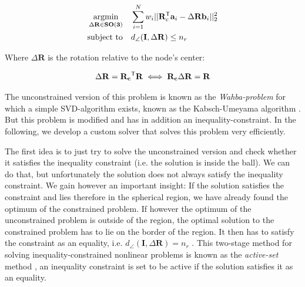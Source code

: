 \begin{equation}
	\label{eq:tls-rwls}
	\begin{aligned}
		\operatorname*{argmin}_{\Delta \mathbf{R} \in \mathbf{SO(3)}}  \quad &\sum_{i=1}^{N} w_i ||\mathbf{R}_c^{\mathsf{T}} \mathbf{a}_i - \Delta\mathbf{R} \mathbf{b}_i ||_2^2 \\
		\text{subject to} \quad &d_{\angle}(\mathbf{I}, \Delta\mathbf{R}) \leq n_r
	\end{aligned}
\end{equation}

Where $\Delta\mathbf{R}$ is the rotation relative to the node's center: 

\begin{equation}
	\begin{aligned}
		\Delta\mathbf{R} = \mathbf{R_c}^{\mathsf{T}}\mathbf{R} \iff \mathbf{R_c}\Delta\mathbf{R} = \mathbf{R}
	\end{aligned}
\end{equation}

The unconstrained version of this problem is known as the \textit{Wahba-problem} for which a simple SVD-algorithm exists, known as the Kabsch-Umeyama algorithm \cite{Kabsch-1978-Point-set-alignment} \cite{Least-squares-estimation-point-sets-Umeyama-1991} \cite{Lawrence2019APA}. But this problem is modified and has in addition an inequality-constraint. In the following, we develop a custom solver that solves this problem very efficiently. 

The first idea is to just try to solve the unconstrained version and check whether it satisfies the inequality constraint (i.e. the solution is inside the ball). 
We can do that, but unfortunately the solution does not always satisfy the inequality constraint. We gain however an important insight: If the solution satisfies the constraint and lies therefore in the spherical region, we have already found the optimum of the constrained problem. If however the optimum of the unconstrained problem is outside of the region, the optimal solution to the constrained problem has to lie on the border of the region. It then has to satisfy the constraint as an equality, i.e. $ d_{\angle}(\mathbf{I}, \Delta\mathbf{R})  = n_r$ \cite[Ch.15 p.424-427]{Numerical-Optimization-Nocedal-Wright}.
This two-stage method for solving inequality-constrained nonlinear problems is known as the \textit{active-set} method \cite[Ch. 16.5, p.467]{Numerical-Optimization-Nocedal-Wright}, an inequality constraint is set to be active if the solution satisfies it as an equality. 

